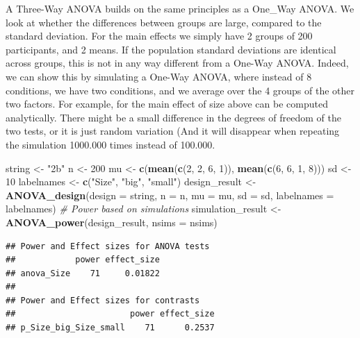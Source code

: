 \documentclass[]{book}
\newenvironment{Shaded}{\begin{snugshade}}{\end{snugshade}}
\newcommand{\CommentTok}[1]{\textcolor[rgb]{0.56,0.35,0.01}{\textit{#1}}}
\newcommand{\DataTypeTok}[1]{\textcolor[rgb]{0.13,0.29,0.53}{#1}}
\newcommand{\DecValTok}[1]{\textcolor[rgb]{0.00,0.00,0.81}{#1}}
\newcommand{\KeywordTok}[1]{\textcolor[rgb]{0.13,0.29,0.53}{\textbf{#1}}}
\newcommand{\NormalTok}[1]{#1}
\newcommand{\StringTok}[1]{\textcolor[rgb]{0.31,0.60,0.02}{#1}}
\begin{document}
A Three-Way ANOVA builds on the same principles as a One\_Way ANOVA. We look at whether the differences between groups are large, compared to the standard deviation. For the main effects we simply have 2 groups of 200 participants, and 2 means. If the population standard deviations are identical across groups, this is not in any way different from a One-Way ANOVA. Indeed, we can show this by simulating a One-Way ANOVA, where instead of 8 conditions, we have two conditions, and we average over the 4 groups of the other two factors. For example, for the main effect of size above can be computed analytically. There might be a small difference in the degrees of freedom of the two tests, or it is just random variation (And it will disappear when repeating the simulation 1000.000 times instead of 100.000.

\begin{Shaded}
\begin{Highlighting}[]
\NormalTok{string <-}\StringTok{ "2b"}
\NormalTok{n <-}\StringTok{ }\DecValTok{200}
\NormalTok{mu <-}\StringTok{ }\KeywordTok{c}\NormalTok{(}\KeywordTok{mean}\NormalTok{(}\KeywordTok{c}\NormalTok{(}\DecValTok{2}\NormalTok{, }\DecValTok{2}\NormalTok{, }\DecValTok{6}\NormalTok{, }\DecValTok{1}\NormalTok{)), }\KeywordTok{mean}\NormalTok{(}\KeywordTok{c}\NormalTok{(}\DecValTok{6}\NormalTok{, }\DecValTok{6}\NormalTok{, }\DecValTok{1}\NormalTok{, }\DecValTok{8}\NormalTok{)))}
\NormalTok{sd <-}\StringTok{ }\DecValTok{10}
\NormalTok{labelnames <-}\StringTok{ }\KeywordTok{c}\NormalTok{(}\StringTok{"Size"}\NormalTok{, }\StringTok{"big"}\NormalTok{, }\StringTok{"small"}\NormalTok{)}
\NormalTok{design_result <-}\StringTok{ }\KeywordTok{ANOVA_design}\NormalTok{(}\DataTypeTok{design =}\NormalTok{ string,}
                   \DataTypeTok{n =}\NormalTok{ n, }
                   \DataTypeTok{mu =}\NormalTok{ mu, }
                   \DataTypeTok{sd =}\NormalTok{ sd, }
                   \DataTypeTok{labelnames =}\NormalTok{ labelnames)}
\CommentTok{# Power based on simulations}
\NormalTok{simulation_result <-}\StringTok{ }\KeywordTok{ANOVA_power}\NormalTok{(design_result, }\DataTypeTok{nsims =}\NormalTok{ nsims)}
\end{Highlighting}
\end{Shaded}

\begin{verbatim}
## Power and Effect sizes for ANOVA tests
##            power effect_size
## anova_Size    71     0.01822
## 
## Power and Effect sizes for contrasts
##                       power effect_size
## p_Size_big_Size_small    71      0.2537
\end{verbatim}
\end{document}
